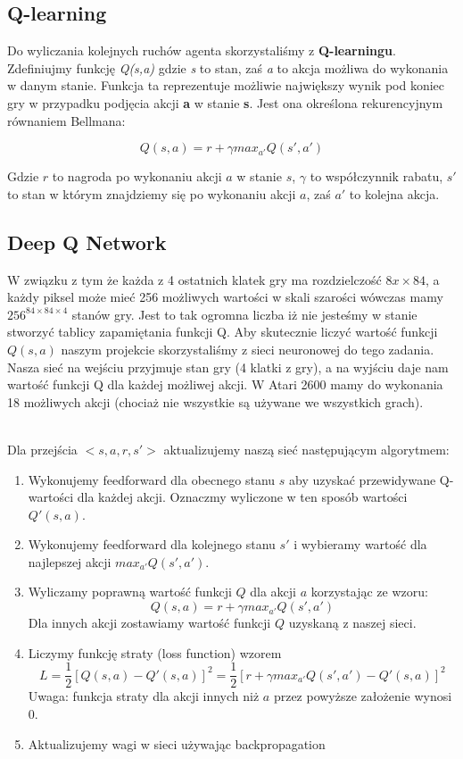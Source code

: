 \documentclass[12pt]{article}
\begin{document}
\subsection{Q-learning}

Do wyliczania kolejnych ruchów agenta skorzystaliśmy z \textbf{Q-learningu}. Zdefiniujmy funkcję \textit{Q(s,a)} gdzie \textit{s} to stan, zaś \textit{a} to akcja możliwa do wykonania w danym stanie. Funkcja ta reprezentuje możliwie największy wynik pod koniec gry w przypadku podjęcia akcji \textbf{a} w stanie \textbf{s}. Jest ona określona rekurencyjnym równaniem Bellmana:

$$Q(s,a) =  r + \gamma max_{a'}Q(s',a')$$

Gdzie $r$ to nagroda po wykonaniu akcji $a$ w stanie $s$, $\gamma$ to współczynnik rabatu, $s'$ to stan w którym znajdziemy się po wykonaniu akcji $a$, zaś $a'$ to kolejna akcja.

\subsection{Deep Q Network}

W związku z tym że każda z 4 ostatnich klatek gry ma rozdzielczość $8x\times 84$, a każdy piksel może mieć 256 możliwych wartości w skali szarości wówczas mamy $256^{84\times84\times4}$ stanów gry. Jest to tak ogromna liczba iż nie jesteśmy w stanie stworzyć tablicy zapamiętania funkcji Q.
Aby skutecznie liczyć wartość funkcji $Q(s,a)$ naszym projekcie skorzystaliśmy z sieci neuronowej do tego zadania. Nasza sieć na wejściu przyjmuje stan gry (4 klatki z gry), a na wyjściu daje nam wartość funkcji Q dla każdej możliwej akcji. W Atari 2600 mamy do wykonania 18 możliwych akcji (chociaż nie wszystkie są używane we wszystkich grach).
\\\

Dla przejścia $<s, a, r, s'>$ aktualizujemy naszą sieć następującym algorytmem:
\begin{enumerate}
\item Wykonujemy feedforward dla obecnego stanu $s$ aby uzyskać przewidywane Q-wartości dla każdej akcji. Oznaczmy wyliczone w ten sposób wartości $Q'(s,a)$.
\item Wykonujemy feedforward dla kolejnego stanu $s'$ i wybieramy wartość dla najlepszej akcji $max_{a'}Q(s',a')$.
\item Wyliczamy poprawną wartość funkcji $Q$ dla akcji $a$ korzystając ze wzoru: $$Q(s, a) = r + \gamma max_{a'}Q(s',a')$$ Dla innych akcji zostawiamy wartość funkcji $Q$ uzyskaną z naszej sieci.
\item Liczymy funkcję straty (loss function) wzorem $$L=\frac{1}{2}[Q(s,a)-Q'(s,a)]^2=\frac{1}{2}[r+\gamma max_{a'}Q(s',a')-Q'(s,a)]^2$$ Uwaga: funkcja straty dla akcji innych niż $a$ przez powyższe założenie wynosi 0. 
\item Aktualizujemy wagi w sieci używając backpropagation
\end{enumerate}
\end{document}
